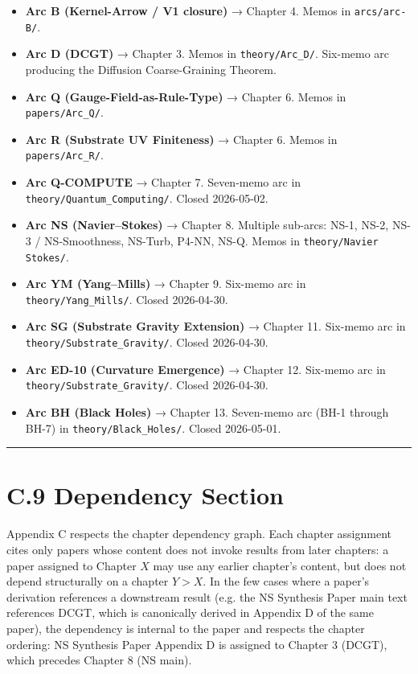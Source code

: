 \documentclass[11pt]{book}
\begin{document}
\begin{itemize}
\item \textbf{Arc B (Kernel-Arrow / V1 closure)} → Chapter 4. Memos in \texttt{arcs/arc-B/}.
\item \textbf{Arc D (DCGT)} → Chapter 3. Memos in \texttt{theory/Arc\_D/}. Six-memo arc producing the Diffusion Coarse-Graining Theorem.
\item \textbf{Arc Q (Gauge-Field-as-Rule-Type)} → Chapter 6. Memos in \texttt{papers/Arc\_Q/}.
\item \textbf{Arc R (Substrate UV Finiteness)} → Chapter 6. Memos in \texttt{papers/Arc\_R/}.
\item \textbf{Arc Q-COMPUTE} → Chapter 7. Seven-memo arc in \texttt{theory/Quantum\_Computing/}. Closed 2026-05-02.
\item \textbf{Arc NS (Navier–Stokes)} → Chapter 8. Multiple sub-arcs: NS-1, NS-2, NS-3 / NS-Smoothness, NS-Turb, P4-NN, NS-Q. Memos in \texttt{theory/Navier Stokes/}.
\item \textbf{Arc YM (Yang–Mills)} → Chapter 9. Six-memo arc in \texttt{theory/Yang\_Mills/}. Closed 2026-04-30.
\item \textbf{Arc SG (Substrate Gravity Extension)} → Chapter 11. Six-memo arc in \texttt{theory/Substrate\_Gravity/}. Closed 2026-04-30.
\item \textbf{Arc ED-10 (Curvature Emergence)} → Chapter 12. Six-memo arc in \texttt{theory/Substrate\_Gravity/}. Closed 2026-04-30.
\item \textbf{Arc BH (Black Holes)} → Chapter 13. Seven-memo arc (BH-1 through BH-7) in \texttt{theory/Black\_Holes/}. Closed 2026-05-01.
\end{itemize}

\bigskip\hrule\bigskip

\section{C.9 Dependency Section}

Appendix C respects the chapter dependency graph. Each chapter assignment cites only papers whose content does not invoke results from later chapters: a paper assigned to Chapter $X$ may use any earlier chapter's content, but does not depend structurally on a chapter $Y > X$. In the few cases where a paper's derivation references a downstream result (e.g. the NS Synthesis Paper main text references DCGT, which is canonically derived in Appendix D of the same paper), the dependency is internal to the paper and respects the chapter ordering: NS Synthesis Paper Appendix D is assigned to Chapter 3 (DCGT), which precedes Chapter 8 (NS main).
\end{document}
